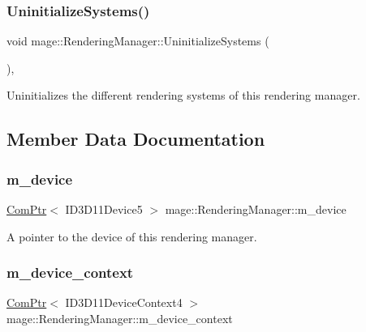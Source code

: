 \subsubsection{\texorpdfstring{Uninitialize\+Systems()}{UninitializeSystems()}}
{\footnotesize\ttfamily void mage\+::\+Rendering\+Manager\+::\+Uninitialize\+Systems (\begin{DoxyParamCaption}{ }\end{DoxyParamCaption})\hspace{0.3cm}{\ttfamily [private]}, {\ttfamily [noexcept]}}

Uninitializes the different rendering systems of this rendering manager. 

\subsection{Member Data Documentation}
\hypertarget{classmage_1_1_rendering_manager_adeb8bcb91a132686d683b33af46979f8}{}\label{classmage_1_1_rendering_manager_adeb8bcb91a132686d683b33af46979f8} 
\subsubsection{\texorpdfstring{m\+\_\+device}{m\_device}}
{\footnotesize\ttfamily \hyperlink{namespacemage_ae74f374780900893caa5555d1031fd79}{Com\+Ptr}$<$ I\+D3\+D11\+Device5 $>$ mage\+::\+Rendering\+Manager\+::m\+\_\+device\hspace{0.3cm}{\ttfamily [private]}}

A pointer to the device of this rendering manager. \hypertarget{classmage_1_1_rendering_manager_a8838eae5c90bbdf5282655ac4f7af7fd}{}\label{classmage_1_1_rendering_manager_a8838eae5c90bbdf5282655ac4f7af7fd} 
\subsubsection{\texorpdfstring{m\+\_\+device\+\_\+context}{m\_device\_context}}
{\footnotesize\ttfamily \hyperlink{namespacemage_ae74f374780900893caa5555d1031fd79}{Com\+Ptr}$<$ I\+D3\+D11\+Device\+Context4 $>$ mage\+::\+Rendering\+Manager\+::m\+\_\+device\+\_\+context\hspace{0.3cm}{\ttfamily [private]}}

